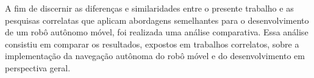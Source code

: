 A fim de discernir as diferenças e similaridades entre o presente trabalho e as pesquisas correlatas que aplicam abordagens semelhantes para o desenvolvimento de um robô autônomo móvel, foi realizada uma análise comparativa. Essa análise consistiu em comparar os resultados,  expostos em trabalhos correlatos, sobre a implementação da navegação autônoma do robô móvel e do desenvolvimento em perspectiva geral.


